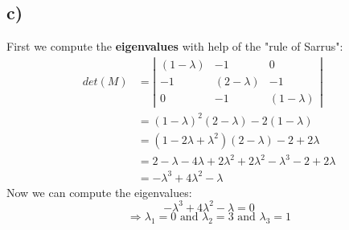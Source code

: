 \documentclass[a4paper]{article}
\begin{document}
    \subsection*{c)}
            First we compute the \textbf{eigenvalues} with help of the "rule of Sarrus":
            \begin{align*}
                det(M) &= \left| \begin{matrix} (1-\lambda) & -1 & 0 \\ -1 & (2-\lambda) & -1 \\ 0 & -1 & (1-\lambda) \end{matrix} \right|\\ 
                &= (1 - \lambda)^2 (2 - \lambda) - 2 (1 - \lambda)\\
                &= (1 - 2\lambda + \lambda^2) (2 - \lambda) - 2 + 2\lambda\\
                &= 2 - \lambda - 4\lambda + 2\lambda^2 + 2\lambda^2 -\lambda^3 - 2 + 2\lambda\\
                &= -\lambda^3 + 4\lambda^2 - \lambda
            \end{align*}
            Now we can compute the eigenvalues:
                $$-\lambda^3 + 4\lambda^2 - \lambda = 0$$
                $$\Rightarrow \lambda_1 = 0 \text{ and } \lambda_2 = 3 \text{ and } \lambda_3 = 1$$
            
\end{document}
